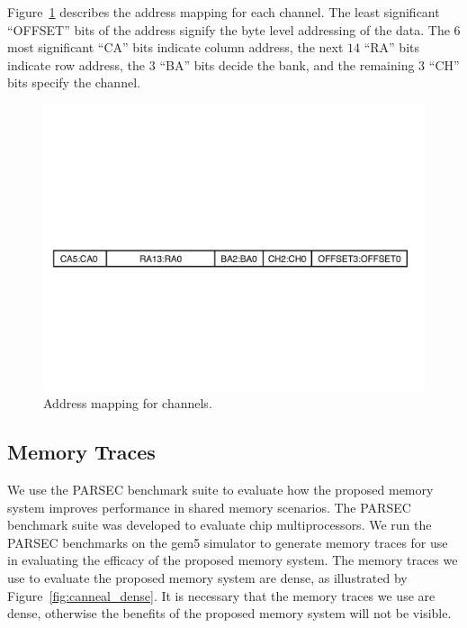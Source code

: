 \begin{remark} %
\label{rem:address}
Figure~\ref{fig:mapping} describes the address mapping for each channel. The least significant ``OFFSET'' bits of the address signify the byte level addressing of the data. The $6$ most significant ``CA'' bits indicate column address, the next $14$ ``RA'' bits indicate row address, the $3$ ``BA'' bits decide the bank, and the remaining $3$ ``CH'' bits specify the channel. 
\end{remark}
\begin{figure}[h!] \centering
\includegraphics[width=0.98\linewidth]{figures/ChAddressing.pdf} 
\caption{Address mapping for channels.}
\label{fig:mapping}
\end{figure}

\subsection{Memory Traces}
We use the PARSEC benchmark suite to evaluate how the proposed memory system improves performance in shared memory scenarios. The PARSEC benchmark suite was developed to evaluate chip multiprocessors. We run the PARSEC benchmarks on the gem5 simulator to generate memory traces for use in evaluating the efficacy of the proposed memory system. The memory traces we use to evaluate the proposed memory system are dense, as illustrated by Figure~\ref{fig:canneal_dense}. It is necessary that the memory traces we use are dense, otherwise the benefits of the proposed memory system will not be visible.
 
